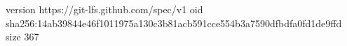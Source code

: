 version https://git-lfs.github.com/spec/v1
oid sha256:14ab39844e46f1011975a130c3b81acb591cce554b3a7590dfbdfa0fd1de9ffd
size 367
